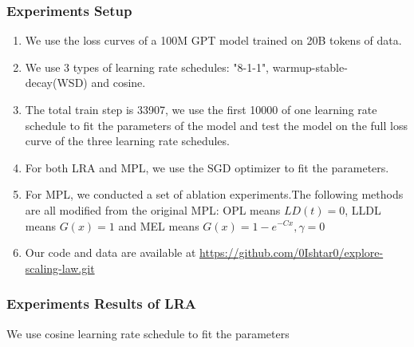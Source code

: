 \documentclass[aspectratio=169]{beamer}
\begin{document}
\begin{frame}
    \frametitle{Experiments Setup}
    \begin{enumerate}
        \item We use the loss curves of a 100M GPT model trained on
            20B tokens of data.
        \item We use 3 types of learning rate schedules: "8-1-1",
            warmup-stable-decay(WSD) and cosine.
        \item The total train step is 33907, we use the first 10000
            of one learning rate schedule to fit the parameters of
            the model and test the model on the full loss curve of
            the three learning rate schedules.
        \item For both LRA and MPL, we use the SGD optimizer to fit
            the parameters.
        \item For MPL, we conducted a set of ablation experiments.The
            following methods are all
            modified from the original MPL: OPL means $LD(t)=0$, LLDL
            means $G(x)=1$ and MEL means $G(x) = 1-e^{-Cx},\gamma = 0$
        \item Our code and data are available at
            \url{https://github.com/0Ishtar0/explore-scaling-law.git}
    \end{enumerate}
\end{frame}

\begin{frame}
    \frametitle{Experiments Results of LRA}
    We use cosine learning rate schedule to fit the parameters
    \begin{figure}
        \centering
        \label{fig:figure}
    \end{figure}
\end{frame}
\end{document}
